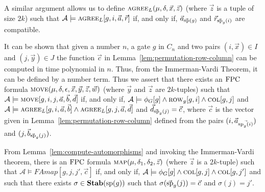 \documentclass[../paper.tex]{subfiles}
\begin{document}

A similar argument allows us to define $\textsc{agree}_L (\mu, \delta , \vec{x}, \vec{z})$ (where $\vec{z}$ is a tuple of size $2k$) such that $\mathcal{A} \models \textsc{agree}_L [g, i, \vec{a}, \vec{r}]$ if, and only if, $\vec{a}_{\vec{\text{sp}}(g)}$ and $\vec{r}_{\vec{\text{sp}}_g(i)}$ are compatible.

It can be shown that given a number $n$, a gate $g$ in $C_n$ and two pairs $(i, \vec{x}) \in I$ and $(j, \vec{y}) \in J$ the function $\vec{c}$ in Lemma~\ref{lem:permutation-row-column} can be computed in time polynomial in $n$. Thus, from the Immerman-Vardi Theorem, it can be defined by a number term. Thus we assert that there exists an $\text{\upshape FPC}$ formula $\textsc{move} (\mu, \delta, \epsilon, \vec{x}, \vec{y}, \vec{z}, \vec{w})$ (where $\vec{y}$ and $\vec{z}$ are $2k$-tuples) such that $\mathcal{A} \models \textsc{move} [g, i, j, \vec{a}, \vec{b}, \vec{d}]$ if, and only if, $\mathcal{A} \models \phi_G [g] \land \textsc{row}_g[g,i] \land \textsc{col}[g, j]$ and $\mathcal{A} \models \textsc{agree}_L [g, i, \vec{a}, \vec{b}] \land \textsc{agree}_L [g, j, \vec{a}, \vec{d}]$ and $\vec{d}_{\vec{\text{sp}}_g(j)} = \vec{c}$, where $\vec{c}$ is the vector given in Lemma~\ref{lem:permutation-row-column} defined from the pairs $(i, \vec{a}_{\vec{\text{sp}_g(i)}})$ and $(j, \vec{b}_{\vec{\text{sp}}_g(j)})$.

From Lemma~\ref{lem:compute-automorphisms} and invoking the Immerman-Vardi theorem, there is an $\text{\upshape FPC}$ formula $\textsc{map}(\mu, \delta_1, \delta_2, \vec{z})$ (where $\vec{z}$ is a $2k$-tuple) such that $\mathcal{A} \models FA{map}[g, j, j', \vec{c}]$ if, and only if, $\mathcal{A} \models \phi_G [g] \land \textsc{col}[g, j] \land \textsc{col}[g, j']$ and such that there exists $\sigma \in \text{\textbf{Stab}} (\text{sp} (g))$ such that $\sigma (\vec{\text{sp}}_g(j)) = \vec{c}$ and $\sigma (j) = j'$.
				
				
\end{document}
